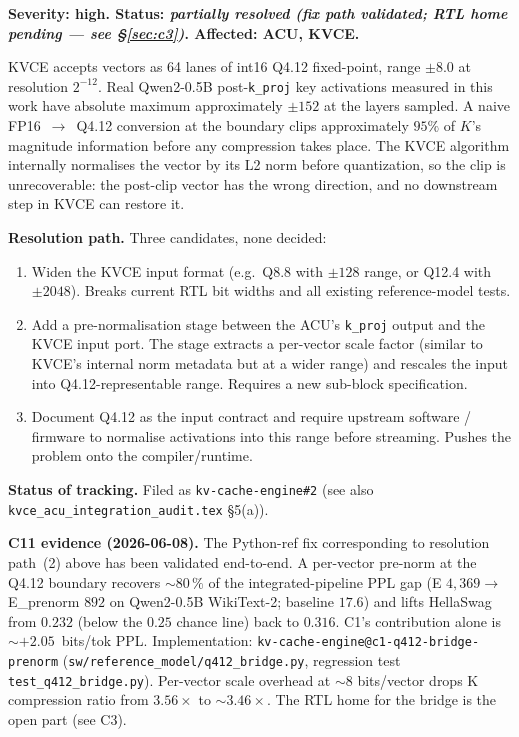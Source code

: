 \documentclass[11pt]{article}
\begin{document}
\textbf{Severity: high. Status: \textit{partially resolved (fix path
validated; RTL home pending --- see \S\ref{sec:c3})}. Affected: ACU, KVCE.}

KVCE accepts vectors as 64 lanes of int16 Q4.12 fixed-point, range
$\pm 8.0$ at resolution $2^{-12}$. Real Qwen2-0.5B post-\texttt{k\_proj}
key activations measured in this work have absolute maximum
approximately $\pm 152$ at the layers sampled. A naive
FP16~$\rightarrow$~Q4.12 conversion at the boundary clips
approximately $95\%$ of $K$'s magnitude information before any
compression takes place. The KVCE algorithm internally normalises
the vector by its L2 norm before quantization, so the clip is
unrecoverable: the post-clip vector has the wrong direction, and
no downstream step in KVCE can restore it.

\textbf{Resolution path.} Three candidates, none decided:

\begin{enumerate}
\item Widen the KVCE input format (e.g.\ Q8.8 with $\pm 128$ range,
or Q12.4 with $\pm 2048$). Breaks current RTL bit widths and all
existing reference-model tests.
\item Add a pre-normalisation stage between the ACU's
\texttt{k\_proj} output and the KVCE input port. The stage extracts
a per-vector scale factor (similar to KVCE's internal norm metadata
but at a wider range) and rescales the input into Q4.12-representable
range. Requires a new sub-block specification.
\item Document Q4.12 as the input contract and require upstream
software / firmware to normalise activations into this range before
streaming. Pushes the problem onto the compiler/runtime.
\end{enumerate}

\textbf{Status of tracking.} Filed as \texttt{kv-cache-engine\#2}
(see also \texttt{kvce\_acu\_integration\_audit.tex} \S5(a)).

\textbf{C11 evidence (2026-06-08).} The Python-ref fix corresponding
to resolution path~(2) above has been validated end-to-end. A per-vector
pre-norm at the Q4.12 boundary recovers $\sim 80\,\%$ of the
integrated-pipeline PPL gap (E $4{,}369 \rightarrow$ E\_prenorm $892$
on Qwen2-0.5B WikiText-2; baseline $17.6$) and lifts HellaSwag from
$0.232$ (below the $0.25$ chance line) back to $0.316$. C1's
contribution alone is $\sim +2.05$~bits/tok PPL. Implementation:
\texttt{kv-cache-engine@c1-q412-bridge-prenorm}
(\texttt{sw/reference\_model/q412\_bridge.py}, regression test
\texttt{test\_q412\_bridge.py}). Per-vector scale overhead at $\sim 8$
bits/vector drops K compression ratio from $3.56\times$ to $\sim 3.46\times$.
The RTL home for the bridge is the open part (see C3).
\end{document}
